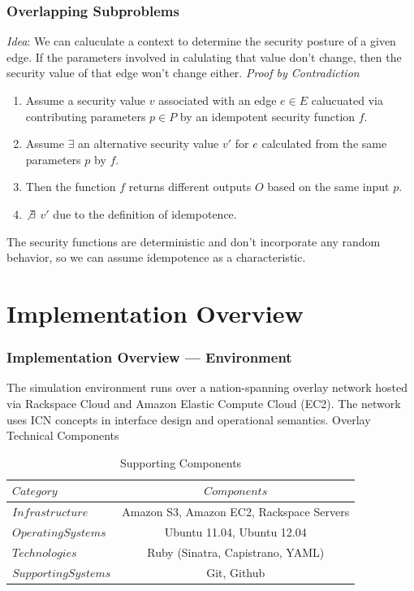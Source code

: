 \documentclass[t,handout, 10pt]{beamer}
\begin{document}
\begin{frame}
\frametitle{Overlapping Subproblems}
{\it Idea}: We can caluculate a context to determine the security posture of a given edge.  If the parameters involved in calulating that value don't change, then the security value of that edge won't change either.
\pause
\newline
\newline
{\it Proof by Contradiction}
{\small
\begin{enumerate}
\item Assume a security value $v$ associated with an edge $e \in E$ calucuated via contributing parameters $p \in P$ by an idempotent security function $f$.
\item Assume $\exists$ an alternative security value $v'$ for $e$ calculated from the same parameters $p$ by $f$.
\item Then the function $f$ returns different outputs $O$ based on the same input $p$.
\item $\not \exists$ $v'$ due to the definition of idempotence. 
\end{enumerate}
}
\color{blue}
{\small
The security functions are deterministic and don't incorporate any random behavior, so we can assume idempotence as a characteristic.
}
\color{black}
\end{frame}

\section{Implementation Overview}
\begin{frame}
\frametitle{Implementation Overview --- Environment}
The simulation environment runs over a nation-spanning overlay network hosted via Rackspace Cloud and Amazon Elastic Compute Cloud (EC2).  The network uses ICN concepts in interface design and operational semantics.
\pause
\newline
\newline
\centering
Overlay Technical Components
\begin{table}[tp] %
\centering %
\begin{tabular}{lc}
\toprule %
$Category$ 				& $Components$ 								\\\toprule %
$Infrastructure$ 		& Amazon S3, Amazon EC2, Rackspace Servers 	\\\midrule
$Operating Systems$		& Ubuntu 11.04, Ubuntu 12.04 				\\\midrule
$Technologies$			& Ruby (Sinatra, Capistrano, YAML) 			\\\midrule
$Supporting Systems$	& Git, Github 								\\\bottomrule
\end{tabular}
\caption{Supporting Components}
\end{table}
\end{frame}
\end{document}
